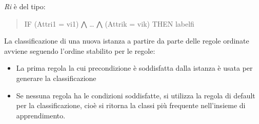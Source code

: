 \emph{Ri} è del tipo:

\begin{quote}
IF (Attri1 = vi1) ⋀ \ldots{} ⋀ (Attrik = vik) THEN labelfi
\end{quote}

La classificazione di una nuova istanza a partire da parte delle regole
ordinate avviene seguendo l'ordine stabilito per le regole:

\begin{itemize}
\tightlist
\item
  La prima regola la cui precondizione è soddisfatta dalla istanza è
  usata per generare la classificazione
\item
  Se nessuna regola ha le condizioni soddisfatte, si utilizza la regola
  di default per la classificazione, cioè si ritorna la classi più
  frequente nell'insieme di apprendimento.
\end{itemize}

